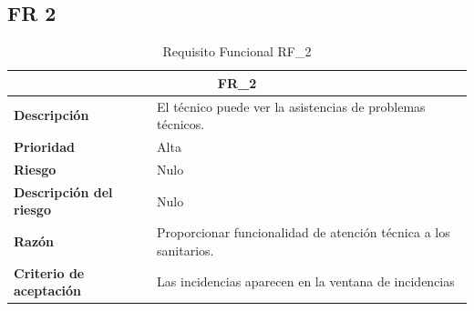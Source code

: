 \documentclass{scrreprt}
\begin{document}
\subsection{FR 2}
    \begin{table}[H]
    
    \label{tab:my-table}
    
    \begin{tabular}{|p{5cm}|p{11cm}|}
    \hline
    \multicolumn{2}{|c|}{\textbf{FR_2}} \\
    \hline
    \textbf{Descripción  }                      & El técnico puede ver la asistencias de problemas técnicos.                                                                             \\ \hline
    \textbf{Prioridad}                          & Alta                                                                                              \\ \hline
    \textbf{Riesgo}                          & Nulo                                                                                                \\ \hline
    \textbf{Descripción del riesgo}                    & Nulo                                                                               \\ \hline
    \textbf{Razón}                   & Proporcionar funcionalidad de atención técnica a los sanitarios.                                                                                               \\ \hline
    \textbf{Criterio de aceptación}                    &  Las incidencias aparecen en la ventana de incidencias \\ \hline
    \end{tabular}%
    
    \caption{Requisito Funcional RF_2}
\end{table}
\end{document}
